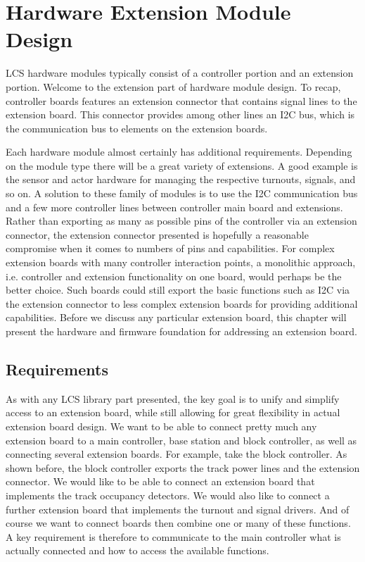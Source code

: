 \chapter{Hardware Extension Module Design}

LCS hardware modules typically consist of a controller portion and an extension portion. Welcome to the extension part of hardware module design. To recap, controller boards features an extension connector that contains signal lines to the extension board. This connector provides among other lines an I2C bus, which is the communication bus to elements on the extension boards.

Each hardware module almost certainly has additional requirements. Depending on the module type there will be a great variety of extensions. A good example is the sensor and actor hardware for managing the respective turnouts, signals, and so on. A solution to these family of modules is to use the I2C communication bus and a few more controller lines between controller main board and extensions. Rather than exporting as many as possible pins of the controller via an extension connector, the extension connector presented is hopefully a reasonable compromise when it comes to numbers of pins and capabilities. For complex extension boards with many controller interaction points, a monolithic approach, i.e. controller and extension functionality on one board, would perhaps be the better choice. Such boards could still export the basic functions such as I2C via the extension connector to less complex extension boards for providing additional capabilities. Before we discuss any particular extension board, this chapter will present the hardware and firmware foundation for addressing an extension board.

\section{Requirements}

As with any LCS library part presented, the key goal is to unify and simplify access to an extension board, while still allowing for great flexibility in actual extension board design. We want to be able to connect pretty much any extension board to a main controller, base station and block controller, as well as connecting several extension boards. For example, take the block controller. As shown before, the block controller exports the track power lines and the extension connector. We would like to be able to connect an extension board that implements the track occupancy detectors. We would also like to connect a further extension board that implements the turnout and signal drivers. And of course we want to connect boards then combine one or many of these functions. A key requirement is therefore to communicate to the main controller what is actually connected and how to access the available functions.

